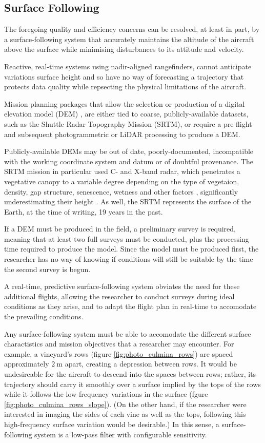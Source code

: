 \documentclass[doc]{apa6}
\begin{document}
\subsection{Surface Following}

The foregoing quality and efficiency concerns can be resolved, at least in part, by a surface-following system that accurately maintains the altitude of the aircraft above the surface while minimising disturbances to its attitude and velocity. 

Reactive, real-time systems using nadir-aligned rangefinders, cannot anticipate variations surface height and so have no way of forecasting a trajectory that protects data quality while repsecting the physical limitations of the aircraft.

Mission planning packages that allow the selection or production of a digital elevation model (DEM) \parencite[e.g.,][]{PrecisionHawk2018,UgCS2018,MapsMadeEasy2018}, are either tied to coarse, publicly-available datasets, such as the Shuttle Radar Topography Mission (SRTM), or require a pre-flight and subsequent photogrammetric or LiDAR processing to produce a DEM. 

Publicly-available DEMs may be out of date, poorly-documented, incompatible with the working coordinate system and datum or of doubtful provenance. The SRTM mission in particular used C- and X-band radar, which penetrates a vegetative canopy to a variable degree depending on the type of vegetaion, density, gap structure, senescence, wetness and other factors \parencite{Miliaresis2009}, significantly underestimating their height \parencite{Sexton2009}. As well, the SRTM represents the surface of the Earth, at the time of writing, 19 years in the past. 

If a DEM must be produced in the field, a preliminary survey is required, meaning that at least two full surveys must be conducted, plus the processing time required to produce the model. Since the model must be produced first, the researcher has no way of knowing if conditions will still be suitable by the time the second survey is begun. 

A real-time, predictive surface-following system obviates the need for these additional flights, allowing the researcher to conduct surveys during ideal conditions as they arise, and to adapt the flight plan in real-time to accomodate the prevailing conditions.

Any surface-following system must be able to accomodate the different surface charactistics and mission objectives that a researcher may encounter. For example, a vineyard's rows (figure \ref{fig:photo_culmina_rows}) are spaced approximately $\SI{2}\m$ apart, creating a depression between rows. It would be undesireable for the aircraft to descend into the spaces between rows; rather, its trajectory should carry it smoothly over a surface implied by the tops of the rows while it follows the low-frequency variations in the surface (fgure \ref{fig:photo_culmina_rows_slope}). (On the other hand, if the researcher were interested in imaging the sides of each vine as well as the tops, following this high-frequency surface variation would be desirable.) In this sense, a surface-following system is a low-pass filter with configurable sensitivity. 
\end{document}
